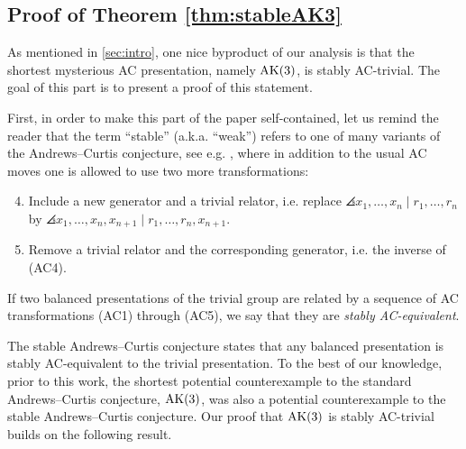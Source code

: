 
\subsection{Proof of Theorem \ref{thm:stableAK3}}
\label{sec:stable_ak3}


As mentioned in \autoref{sec:intro}, one nice byproduct of our analysis is that the shortest mysterious AC presentation, namely $\text{AK}(3)$, is stably AC-trivial. The goal of this part is to present a proof of this statement.

First, in order to make this part of the paper self-contained, let us remind the reader that the term ``stable'' (a.k.a. ``weak'') refers to one of many variants of the Andrews--Curtis conjecture, see e.g. \cite{MMS,Meier2016,Bagherifard2021}, where in addition to the usual AC moves one is allowed to use two more transformations:
\begin{enumerate}[label=(AC\arabic*)]
	\setcounter{enumi}{3}
	\item Include a new generator and a trivial relator, i.e. replace $\angles{x_1, \dots, x_n \mid r_1, \dots, r_n}$ by $\angles{x_1, \dots, x_n, x_{n+1} \mid r_1, \dots, r_n, x_{n+1}}$.
	\item Remove a trivial relator and the corresponding generator, i.e. the inverse of (AC4).
\end{enumerate}

\begin{definition}
If two balanced presentations of the trivial group are related by a sequence of AC transformations (AC1) through (AC5), we say that they are \textit{stably AC-equivalent}.
\end{definition}
The stable Andrews--Curtis conjecture states that any balanced presentation is stably AC-equivalent to the trivial presentation.
To the best of our knowledge, prior to this work, the shortest potential counterexample to the standard Andrews--Curtis conjecture, $\text{AK}(3)$, was also a potential counterexample to the stable Andrews--Curtis conjecture. Our proof that $\text{AK}(3)$ is stably AC-trivial builds on the following result.


